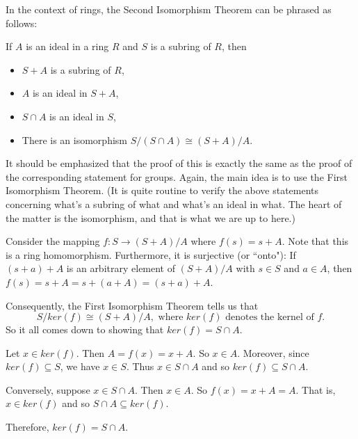 \documentclass[12pt]{article}
\begin{document}
In the context of rings, the Second Isomorphism Theorem can be phrased as follows:

If $A$ is an ideal in a ring $R$ and $S$ is a subring of $R$, then 
\begin{itemize}
\item $S+A$ is a subring of $R$,
\item $A$ is an ideal in $S+A$,
\item $S \cap A$ is an ideal in $S$,
\item There is an isomorphism $S/(S \cap A)\cong (S+A)/A$.
\end{itemize}

It should be emphasized that the proof of this is exactly the same as the proof of the corresponding statement for groups. Again, the main idea is to use the First Isomorphism Theorem. (It is quite routine to verify the above statements concerning what's a subring of what and what's an ideal in what. The heart of the matter is the isomorphism, and that is what we are up to here.)

Consider the mapping $f:S\rightarrow (S+A)/A$ where $f(s)=s+A$. Note that this is a ring homomorphism. Furthermore, it is surjective (or ``onto"): If $(s+a)+A$ is an arbitrary element of $(S+A)/A$ with $s\in S$ and $a\in A$, then $f(s)=s+A=s+(a+A)=(s+a)+A$.

Consequently, the First Isomorphism Theorem tells us that
\[
S/ker(f)\cong (S+A)/A,\text{ where }ker(f)\text{ denotes the kernel of }f.
\]
So it all comes down to showing that $ker(f)=S\cap A$.

Let $x\in ker(f)$. Then $A=f(x)=x+A$. So $x\in A$. Moreover, since $ker(f)\subseteq S$, we have $x\in S$. Thus $x\in S\cap A$ and so $ker(f)\subseteq S\cap A$.

Conversely, suppose $x\in S\cap A$. Then $x\in A$. So $f(x)=x+A=A$. That is, $x\in ker(f)$ and so $S\cap A\subseteq ker(f)$.

Therefore, $ker(f)=S\cap A$.
\end{document}
